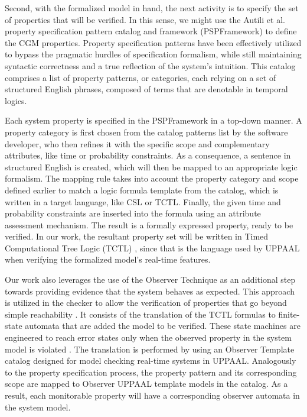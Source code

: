 Second, with the formalized model in hand, the next activity is to specify the set of properties that will be verified. In this sense, we might use the Autili et al. \cite{2015PropertySpecCatalog} property specification pattern catalog and framework (PSPFramework) to define the CGM properties. Property specification patterns have been effectively utilized to bypass the pragmatic hurdles of specification formalism, while still maintaining syntactic correctness and a true reflection of the system's intuition. This catalog comprises a list of property patterns, or categories, each relying on a set of structured English phrases, composed of terms that are denotable in temporal logics.

Each system property is specified in the PSPFramework in a top-down manner. A property category is first chosen from the catalog patterns list by the software developer, who then refines it with the specific scope and complementary attributes, like time or probability constraints. As a consequence, a sentence in structured English is created, which will then be mapped to an appropriate logic formalism. The mapping rule takes into account the property category and scope defined earlier to match a logic formula template from the catalog, which is written in a target language, like CSL or TCTL. Finally, the given time and probability constraints are inserted into the formula using an attribute assessment mechanism. The result is a formally expressed property, ready to be verified. In our work, the resultant property set will be written in Timed Computational Tree Logic (TCTL) \cite{1996TCTL}, since that is the language used by UPPAAL when verifying the formalized model's real-time features. 

Our work also leverages the use of the Observer Technique as an additional step towards providing evidence that the system behaves as expected. This approach is utilized in the checker to allow the verification of properties that go beyond simple reachability \cite{1998ReachabilityObs}. It consists of the translation of the TCTL formulas to finite-state automata that are added the model to be verified. These state machines are engineered to reach error states only when the observed property in the system model is violated \cite{1999Observers}. 
The translation is performed by using an Observer Template catalog \cite{2022PSP} designed for model checking real-time systems in UPPAAL. Analogously to the property specification process, the property pattern and its corresponding scope are mapped to Observer UPPAAL template models in the catalog. As a result, each monitorable property will have a corresponding observer automata in the system model.

